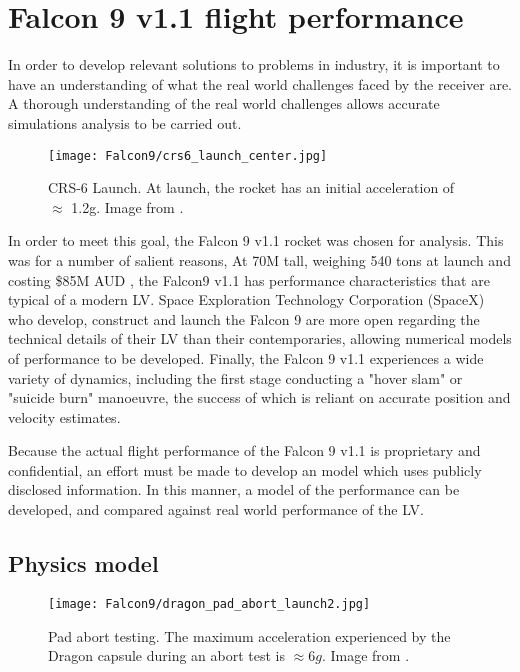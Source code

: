 \chapter{Falcon 9 v1.1 flight performance}
\label{ch:Falcon9}

In order to develop relevant solutions to  problems in industry, it is important to have an understanding of what the real world challenges faced by the receiver are. A thorough understanding of the real world challenges allows accurate simulations analysis to be carried out.

\begin{figure}[!htb] 
    \centering
    \texttt{[image: Falcon9/crs6\_launch\_center.jpg]} 
    \caption{CRS-6 Launch. At launch, the rocket has an initial acceleration of $\approx$ 1.2g. Image from \cite{SpaceXPhotos}.}
    \label{fig:Falcon9}
\end{figure}


In order to meet this goal, the Falcon 9 v1.1 rocket was chosen for analysis. This was for a number of salient reasons, At 70M tall, weighing 540 tons at launch and costing \$85M AUD \cite{SpaceX}, the Falcon9 v1.1 has performance characteristics that are typical of a modern \ac{LV}. Space Exploration Technology Corporation (SpaceX) who develop, construct and launch the Falcon 9 are more open regarding the technical details of their \ac{LV} than their contemporaries, allowing numerical models of performance to be developed. Finally, the Falcon 9 v1.1 experiences a wide variety of dynamics, including the first stage conducting a "hover slam" or "suicide burn" manoeuvre, the success of which is reliant on accurate position and velocity estimates.

Because the actual flight performance of the Falcon 9 v1.1 is proprietary and confidential, an effort must be made to develop an model which uses publicly disclosed information. In this manner, a model of the performance can be developed, and compared against real world performance of the \ac{LV}.

\section{Physics model}

\begin{figure}[!htb] 
    \centering
    \texttt{[image: Falcon9/dragon\_pad\_abort\_launch2.jpg]} 
    \caption{Pad abort testing. The maximum acceleration experienced by the Dragon capsule during an abort test is $\approx 6g$. Image from \cite{SpaceXPhotos}.}
    \label{fig:PadAbort}
\end{figure}

